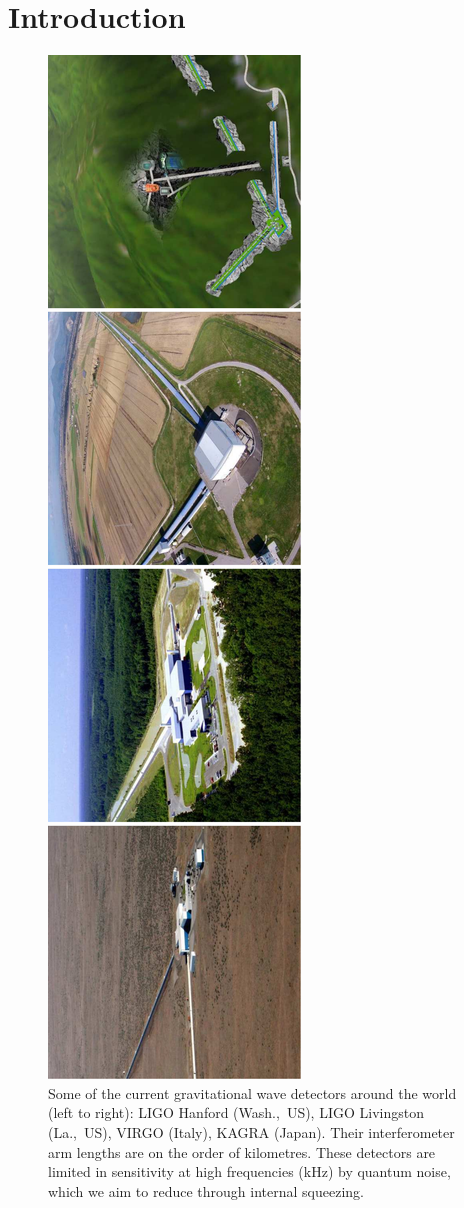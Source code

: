 \documentclass[aps,pra,superscriptaddress,reprint,nofootinbib]{revtex4-1}
\begin{document}
\maketitle

\section{Introduction}
\label{sec:introduction}

\begin{figure}[ht!]
	\begin{center}
	\includegraphics[height=.8\textwidth,angle=-90]{figures/gwo_ifos-pictures.pdf}
	\end{center}
	\caption{Some of the current gravitational wave detectors around the world (left to right): LIGO Hanford (Wash.,~US), LIGO Livingston (La.,~US), VIRGO (Italy), KAGRA (Japan). Their interferometer arm lengths are on the order of kilometres. These detectors are limited in sensitivity at high frequencies (kHz) by quantum noise, which we aim to reduce through internal squeezing.}
	\label{fig:gw_ifos}
\end{figure}
\end{document}
